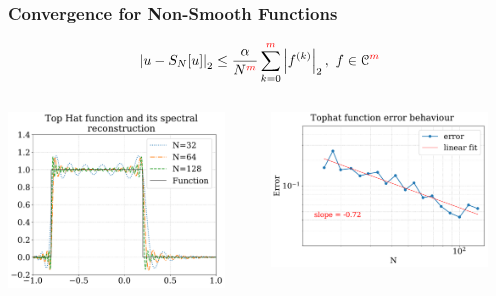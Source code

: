 \documentclass[9pt,usepdftitle=false,aspectratio=169]{beamer}
\newcommand{\norm}[1]{\left| #1 \right|_2}
\begin{document}
\begin{frame}
  \frametitle{Convergence for Non-Smooth Functions}
  \begin{Large}
  \begin{displaymath}
    \norm{u - S_N[u]} \leq \frac{\alpha}{N^{\color{red}m}}\sum_{k=0}^{{\color{red}m}}
    \norm{f^{(k)}},\ f\in \mathcal{C}^{\color{red}m}
  \end{displaymath}
  \end{Large}
  \begin{columns}
    \begin{column}{0.5\textwidth}
      \begin{center}
        \includegraphics[width=0.9\textwidth]{gibbs}
      \end{center}
    \end{column}
    \begin{column}{0.5\textwidth}
      \begin{center}
        \includegraphics[width=0.9\textwidth]{tophat_error}
      \end{center}
    \end{column}
  \end{columns}
\end{frame}
\end{document}
